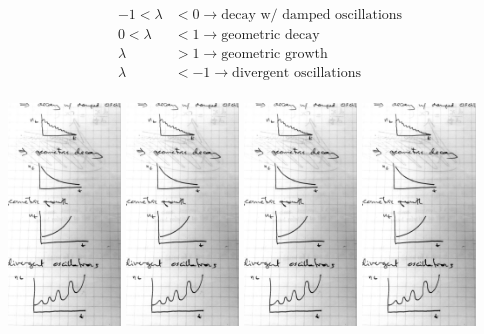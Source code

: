 \documentclass{article}
\begin{document}
\begin{align*}
-1<\lambda &< 0 \to \text{decay w/ damped oscillations}\\
 0<\lambda &< 1 \to \text{geometric decay}\\
 \lambda &> 1 \to \text{geometric growth}\\
 \lambda &<-1 \to \text{divergent oscillations}\\
\end{align*}
\begin{center}
\includegraphics[width=3cm]{figs/DecayOscil.pdf}
\includegraphics[width=3cm]{figs/Decay.pdf}
\includegraphics[width=3cm]{figs/Growth.pdf}
\includegraphics[width=3cm]{figs/GrowthOscil.pdf}
\end{center}
\end{document}
